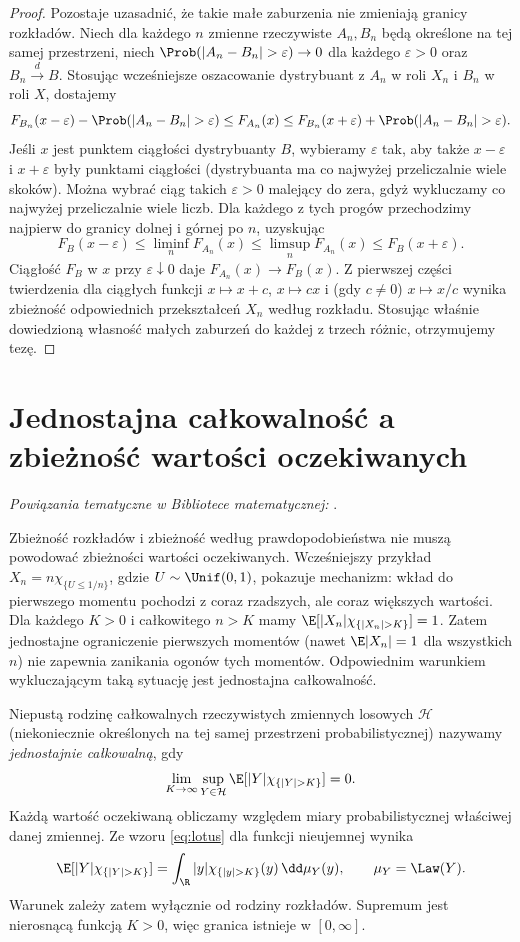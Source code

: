 \begin{proof}
Pozostaje uzasadnić, że takie małe zaburzenia
nie zmieniają granicy rozkładów. Niech dla każdego $n$
zmienne rzeczywiste $A_n,B_n$ będą określone na tej
samej przestrzeni, niech
$\Prob(|A_n-B_n|>\varepsilon)\to0$ dla każdego
$\varepsilon>0$ oraz $B_n\xrightarrow{d}B$.
Stosując wcześniejsze oszacowanie dystrybuant
z $A_n$ w roli $X_n$ i $B_n$ w roli $X$, dostajemy
\[
F_{B_n}(x-\varepsilon)-\Prob(|A_n-B_n|>\varepsilon)
\leq F_{A_n}(x)
\leq F_{B_n}(x+\varepsilon)+\Prob(|A_n-B_n|>\varepsilon).
\]
Jeśli $x$ jest punktem ciągłości dystrybuanty $B$,
wybieramy $\varepsilon$ tak, aby także
$x-\varepsilon$ i $x+\varepsilon$ były punktami
ciągłości (dystrybuanta ma co najwyżej przeliczalnie
wiele skoków). Można wybrać ciąg takich $\varepsilon>0$ malejący do zera,
gdyż wykluczamy co najwyżej przeliczalnie wiele liczb.
Dla każdego z tych progów przechodzimy najpierw
do granicy dolnej i górnej po $n$, uzyskując
\[
F_B(x-\varepsilon)\leq\liminf_n F_{A_n}(x)
\leq\limsup_n F_{A_n}(x)\leq F_B(x+\varepsilon).
\]
Ciągłość $F_B$ w $x$ przy $\varepsilon\downarrow0$
daje $F_{A_n}(x)\to F_B(x)$.
Z pierwszej części twierdzenia dla ciągłych funkcji
$x\mapsto x+c$, $x\mapsto cx$ i (gdy $c\ne0$)
$x\mapsto x/c$ wynika zbieżność odpowiednich
przekształceń $X_n$ według rozkładu.
Stosując właśnie dowiedzioną własność małych zaburzeń
do każdej z trzech różnic, otrzymujemy tezę.
\end{proof}

\section{Jednostajna całkowalność a zbieżność wartości oczekiwanych}

\noindent\emph{Powiązania tematyczne w Bibliotece matematycznej:} .


Zbieżność rozkładów i zbieżność według prawdopodobieństwa
nie muszą powodować zbieżności wartości oczekiwanych.
Wcześniejszy przykład $X_n=n\chi_{\{U\leq1/n\}}$,
gdzie $U\sim\Unif(0,1)$, pokazuje mechanizm:
wkład do pierwszego momentu pochodzi z coraz rzadszych,
ale coraz większych wartości. Dla każdego $K>0$
i całkowitego $n>K$ mamy
$\E[|X_n|\chi_{\{|X_n|>K\}}]=1$.
Zatem jednostajne ograniczenie pierwszych momentów
(nawet $\E|X_n|=1$ dla wszystkich $n$) nie zapewnia
zanikania ogonów tych momentów. Odpowiednim warunkiem wykluczającym
taką sytuację jest jednostajna całkowalność.

\begin{definicja}
Niepustą rodzinę całkowalnych rzeczywistych zmiennych
losowych $\mathcal H$ (niekoniecznie określonych na tej
samej przestrzeni probabilistycznej) nazywamy
\emph{jednostajnie całkowalną}, gdy
\[
\lim_{K\to\infty}\sup_{Y\in\mathcal H}
\E[|Y|\chi_{\{|Y|>K\}}]=0.
\]
Każdą wartość oczekiwaną obliczamy względem miary
probabilistycznej właściwej danej zmiennej. Ze wzoru
\eqref{eq:lotus} dla funkcji nieujemnej wynika
\[
\E[|Y|\chi_{\{|Y|>K\}}]
=\int_\R |y|\chi_{\{|y|>K\}}(y)\,\dd\mu_Y(y),
\qquad \mu_Y=\Law(Y).
\]
Warunek zależy zatem wyłącznie od rodziny rozkładów.
Supremum jest nierosnącą funkcją $K>0$, więc granica
istnieje w $[0,\infty]$.
\end{definicja}


